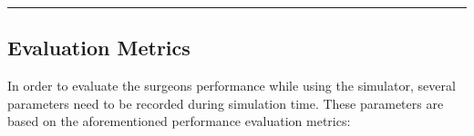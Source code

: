 \hrule%

\subsection{Evaluation Metrics}
\label{ssec:evaluation_metrics}


In order to evaluate the surgeons performance while using the simulator, several parameters need to be recorded during simulation time. These parameters are based on the aforementioned performance evaluation metrics:

